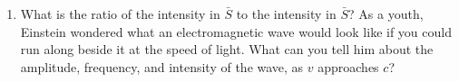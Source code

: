 \documentclass[fleqn]{article}
\begin{document}
\begin{enumerate}
\begin{enumerate}

      \item What is the ratio of the intensity in $\bar{S}$ to the intensity in $\bar{S}$? As a youth, Einstein wondered what an 
      electromagnetic wave would look like if you could run along beside it at the speed of light. What can you tell him about the amplitude,
      frequency, and intensity of the wave, as $v$ approaches $c$?


    \end{enumerate}

  \end{enumerate}
\end{document}
